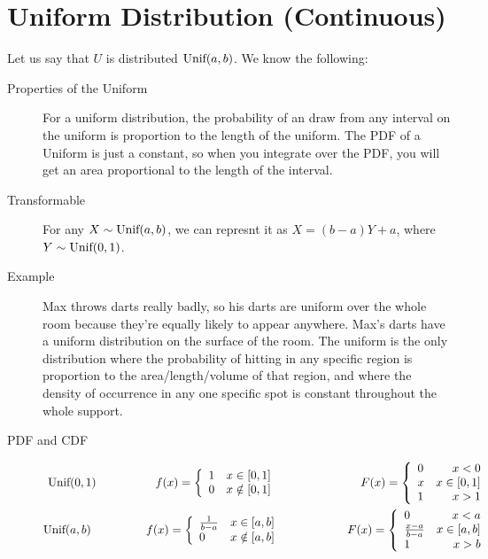 \documentclass[11pt]{article}
\theoremstyle{definition}
\theoremstyle{remark}
\newcommand{\Unif}{\textnormal{Unif}}
\begin{document}
\section{Uniform Distribution (Continuous)}
\begin{description}
\item Let us say that $U$ is distributed $\Unif(a, b)$. We know the following:
\begin{description}
	\item[Properties of the Uniform] For a uniform distribution, the probability of an draw from any interval on the uniform is proportion to the length of the uniform. The PDF of a Uniform is just a constant, so when you integrate over the PDF, you will get an area proportional to the length of the interval.

    \item[Transformable] For any $X \sim \Unif(a,b)$, we can represnt it as $X = (b-a) Y + a$, where $Y \sim \Unif(0,1)$. 

	\item[Example] Max throws darts really badly, so his darts are uniform over the whole room because they're equally likely to appear anywhere. Max's darts have a uniform distribution on the surface of the room. The uniform is the only distribution where the probability of hitting in any specific region is proportion to the area/length/volume of that region, and where the density of occurrence in any one specific spot is constant throughout the whole support.
	\item[PDF and CDF] 
\begin{eqnarray*}
\Unif(0, 1)
  \hspace{.7 in}
   f(x) = \left\{
     \begin{array}{lr}
       1 & x \in [0, 1] \\
       0 &  x \notin [0, 1]
     \end{array}
   \right.
   \hspace{.95 in}
   F(x) = \left\{
     \begin{array}{lr}
       0 & x < 0 \\
       x & x \in [0, 1] \\
       1 &  x > 1
     \end{array}
   \right.\\
\Unif(a, b)
  \hspace{.65 in}
   f(x) = \left\{
     \begin{array}{lr}
       \frac{1}{b-a} & x \in [a, b] \\
       0 &  x \notin [a, b]
     \end{array}
   \right.
   \hspace{.75 in}
   F(x) = \left\{
     \begin{array}{lr}
       0 & x < a \\
       \frac{x-a}{b-a} & x \in [a, b] \\
       1 &  x > b
     \end{array}
   \right. 
\end{eqnarray*}

\end{description}
\end{description}
\end{document}
